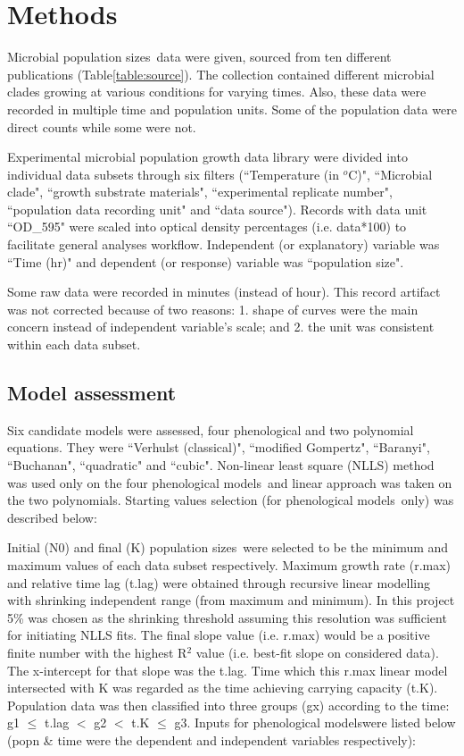 \documentclass[a4paper, 11pt]{article}
\newcommand{\pms}{phenological models}
\newcommand{\fve}{Verhulst (classical)}
\newcommand{\fgo}{modified Gompertz}
\newcommand{\fba}{Baranyi}
\newcommand{\fbu}{Buchanan}
\newcommand{\fqu}{quadratic}
\newcommand{\fcu}{cubic}
\newcommand{\pop}{population size}
\newcommand{\pps}{population sizes}
\begin{document}
	\section*{Methods}
	
	Microbial \pps\ data were given, sourced from ten different publications (Table\ref{table:source}).  The collection contained different microbial clades growing at various conditions for varying times.  Also, these data were recorded in multiple time and population units.  Some of the population data were direct counts while some were not.
	
	Experimental microbial population growth data library were divided into individual data subsets through six filters (``Temperature (in $^o$C)", ``Microbial clade", ``growth substrate materials", ``experimental replicate number", ``population data recording unit" and ``data source").  Records with data unit ``OD\_595" were scaled into optical density percentages (i.e. data*100) to facilitate general analyses workflow.  Independent (or explanatory) variable was ``Time (hr)" and dependent (or response) variable was ``\pop".
	
	Some raw data were recorded in minutes (instead of hour).  This record artifact was not corrected because of two reasons: 1. shape of curves were the main concern instead of independent variable's scale; and 2. the unit was consistent within each data subset.
	
	\subsection*{Model assessment}
	Six candidate models were assessed, four phenological and two polynomial equations.  They were ``\fve"\autocite{mckendrick1912xlv}, ``\fgo"\autocite{GIL200689}, ``\fba"\autocite{baranyi1993modeling}, ``\fbu"\autocite{buchanan1993differentiation}, ``\fqu" and ``\fcu". Non-linear least square (NLLS) method was used only on the four \pms\ and linear approach was taken on the two polynomials.  Starting values selection (for \pms\ only) was described below:
	
	Initial (N0) and final (K) \pps\ were selected to be the minimum and maximum values of each data subset respectively.  Maximum growth rate (r.max) and relative time lag (t.lag) were obtained through recursive linear modelling with shrinking independent range (from maximum and minimum).  In this project 5\% was chosen as the shrinking threshold assuming this resolution was sufficient for initiating NLLS fits.  The final slope value (i.e. r.max) would be a positive finite number with the highest R$^{2}$ value (i.e. best-fit slope on considered data).  The x-intercept for that slope was the t.lag.  Time which this r.max linear model intersected with K was regarded as the time achieving carrying capacity (t.K).  Population data was then classified into three groups (gx) according to the time: g1 $\leq$ t.lag $<$ g2 $<$ t.K $\leq$ g3.  Inputs for \pms were listed below (popn \& time were the dependent and independent variables respectively):
	
\end{document}
